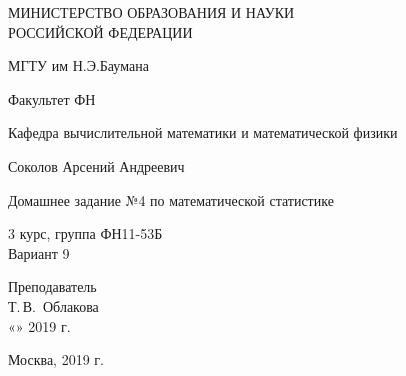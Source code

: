 \documentclass[14pt,a4paper]{scrartcl}
\begin{document}
	\begin{titlepage}
	\begin{center}
		\large
		МИНИСТЕРСТВО ОБРАЗОВАНИЯ И НАУКИ\\ РОССИЙСКОЙ ФЕДЕРАЦИИ
		
		\vspace{0.5cm}
		
		МГТУ им Н.Э.Баумана
		\vspace{0.25cm}
		
		Факультет ФН
		
		Кафедра вычислительной математики и математической физики
		\vfill
		
		
		Соколов Арсений Андреевич\\
		\vfill
		
		
		{\LARGE Домашнее задание №4 по математической статистике\\[2mm]
		}
		\bigskip
		
		3 курс, группа ФН11-53Б\\
		Вариант 9
	\end{center}
	\vfill
	
	\newlength{\ML}
	\hfill\begin{minipage}{0.4\textwidth}
		Преподаватель\\
		\underline{\hspace{3cm}} Т.\,В.~Облакова\\
		«\underline{\hspace{0.7cm}}» \underline{\hspace{1.71cm}} 2019 г.
	\end{minipage}%
	\bigskip
	
	
	\vfill
	
	\begin{center}
		Москва, 2019 г.
	\end{center}
\end{titlepage}
\end{document}
